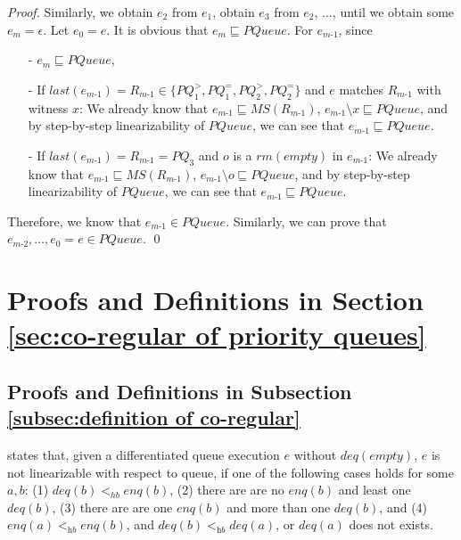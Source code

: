 \begin {proof}
Similarly, we obtain $e_2$ from $e_1$, obtain $e_3$ from $e_2$, $\ldots$, until we obtain some $e_m = \epsilon$. Let $e_0=e$. It is obvious that $e_m \sqsubseteq \textit{PQueue}$. For $e_{\textit{m-1}}$, since

\begin{itemize}
\setlength{\itemsep}{0.5pt}
\item[-] $e_m \sqsubseteq \textit{PQueue}$,

\item[-] If $\textit{last}(e_{\textit{m-1}}) = R_{\textit{m-1}} \in \{ \textit{PQ}_1^{>}, \textit{PQ}_1^{=}, \textit{PQ}_2^{>}, \textit{PQ}_2^{=} \}$ and $e$ matches $R_{\textit{m-1}}$ with witness $x$: We already know that $e_{\textit{m-1}} \sqsubseteq \textit{MS}(R_{\textit{m-1}})$, $e_{\textit{m-1}} \setminus x \sqsubseteq \textit{PQueue}$, and by step-by-step linearizability of $\textit{PQueue}$, we can see that $e_{\textit{m-1}} \sqsubseteq \textit{PQueue}$.


\item[-] If $\textit{last}(e_{\textit{m-1}}) = R_{\textit{m-1}} = \textit{PQ}_3$ and $o$ is a $\textit{rm}(\textit{empty})$ in $e_{\textit{m-1}}$: We already know that $e_{\textit{m-1}} \sqsubseteq \textit{MS}(R_{\textit{m-1}})$, $e_{\textit{m-1}} \setminus o \sqsubseteq \textit{PQueue}$, and by step-by-step linearizability of $\textit{PQueue}$, we can see that $e_{\textit{m-1}} \sqsubseteq \textit{PQueue}$.
\end{itemize}

Therefore, we know that $e_{\textit{m-1}} \in \textit{PQueue}$. Similarly, we can prove that $e_{\textit{m-2}},\ldots,e_0 = e \in \textit{PQueue}$. \qed
\end {proof}


\section{Proofs and Definitions in Section \ref{sec:co-regular of priority queues}}
\label{sec:appendix proof and definition in section co-regular of priority queues}


\subsection{Proofs and Definitions in Subsection \ref{subsec:definition of co-regular}}
\label{sec:appendix proof and definition in section definition of co-regular}

\cite{Bouajjani:2015} states that, given a differentiated queue execution $e$ without $\textit{deq}(\textit{empty})$, $e$ is not linearizable with respect to queue, if one of the following cases holds for some $a,b$: (1) $\textit{deq}(b) <_{hb} \textit{enq}(b)$, (2) there are are no $\textit{enq}(b)$ and least one $\textit{deq}(b)$, (3) there are are one $\textit{enq}(b)$ and more than one $\textit{deq}(b)$, and (4) $\textit{enq}(a) <_{\textit{hb}} \textit{enq}(b)$, and $\textit{deq}(b) <_{\textit{hb}} \textit{deq}(a)$, or $\textit{deq}(a)$ does not exists.

